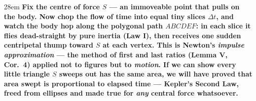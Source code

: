 \documentclass[border=4pt]{standalone}
\begin{document}
\begin{varwidth}{28em}
\large\bfseries
Fix the \textcolor{centerorange}{centre of force $S$} — an immoveable point that pulls on the body.      Now chop the flow of time into equal tiny slices $\Delta t$, and watch the body hop along the      \textcolor{pathblue}{polygonal path $ABCDEF$}: in each slice it flies dead-straight by pure inertia (\textbf{Law I}),      then receives one sudden centripetal thump toward $S$ at each vertex. This is Newton's \textit{impulse      approximation} — the method of first and last ratios (\textbf{Lemma V, Cor.~4}) applied not to figures but to      \emph{motion}. If we can show every little triangle $S$ sweeps out has the same area, we will have proved      that area swept is proportional to elapsed time — Kepler's Second Law, freed from ellipses and made true for      \emph{any} central force whatsoever.
\end{varwidth}
\end{document}
